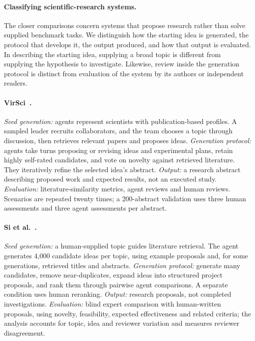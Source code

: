 \documentclass[11pt,a4paper]{article}
\begin{document}
\paragraph{Classifying scientific-research systems.}
The closer comparisons concern systems that propose research rather than
solve supplied benchmark tasks. We distinguish how the starting idea is
generated, the protocol that develops it, the output produced, and how that
output is evaluated. In describing the starting idea, supplying a broad topic
is different from supplying the hypothesis to investigate. Likewise, review
inside the generation protocol is distinct from evaluation of the system by
its authors or independent readers.

\paragraph{VirSci~\cite{su2025virsci}.}
\emph{Seed generation:} agents represent scientists with publication-based
profiles. A sampled leader recruits collaborators, and the team chooses a
topic through discussion, then retrieves relevant papers and proposes ideas.
\emph{Generation protocol:} agents take turns proposing or revising ideas and
experimental plans, retain highly self-rated candidates, and vote on novelty
against retrieved literature. They iteratively refine the selected idea's
abstract. \emph{Output:} a research abstract describing proposed work and
expected results, not an executed study. \emph{Evaluation:} literature-similarity
metrics, agent reviews and human reviews. Scenarios are repeated twenty times;
a 200-abstract validation uses three human assessments and three agent
assessments per abstract.

\paragraph{Si et al.~\cite{si2024ideas}.}
\emph{Seed generation:} a human-supplied topic guides literature retrieval.
The agent generates 4,000 candidate ideas per topic, using example proposals
and, for some generations, retrieved titles and abstracts.
\emph{Generation protocol:} generate many candidates, remove near-duplicates,
expand ideas into structured project proposals, and rank them through pairwise
agent comparisons. A separate condition uses human reranking.
\emph{Output:} research proposals, not completed investigations.
\emph{Evaluation:} blind expert comparison with human-written proposals,
using novelty, feasibility, expected effectiveness and related criteria;
the analysis accounts for topic, idea and reviewer variation and measures
reviewer disagreement.
\end{document}
